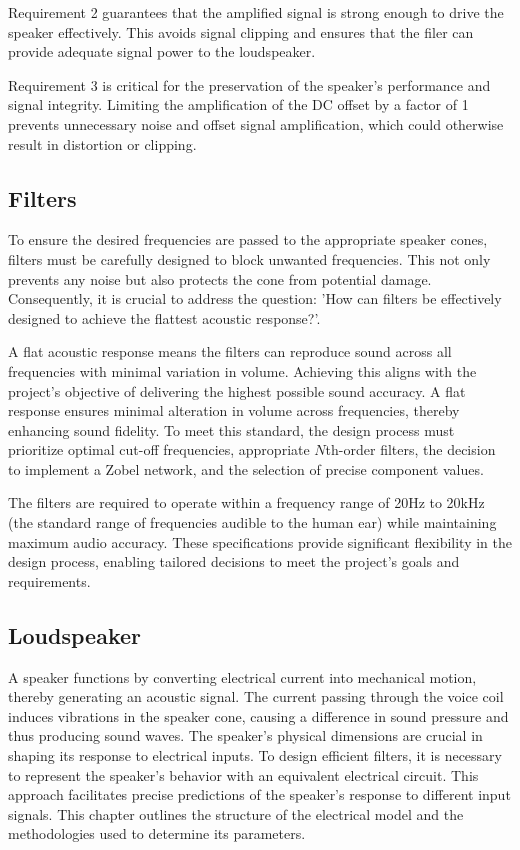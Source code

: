 Requirement 2 guarantees that the amplified signal is strong enough to drive the speaker effectively. This avoids signal clipping and ensures that the filer can provide adequate signal power to the loudspeaker.

Requirement 3 is critical for the preservation of the speaker's performance and signal integrity. Limiting the amplification of the DC offset by a factor of 1 prevents unnecessary noise and offset signal amplification, which could otherwise result in distortion or clipping.

\subsection{Filters}
To ensure the desired frequencies are passed to the appropriate speaker cones, filters must be carefully designed to block unwanted frequencies. This not only prevents any noise but also protects the cone from potential damage. Consequently, it is crucial to address the question: 'How can filters be effectively designed to achieve the flattest acoustic response?'.

A flat acoustic response means the filters can reproduce sound across all frequencies with minimal variation in volume. Achieving this aligns with the project's objective of delivering the highest possible sound accuracy. A flat response ensures minimal alteration in volume across frequencies, thereby enhancing sound fidelity. To meet this standard, the design process must prioritize optimal cut-off frequencies, appropriate $N$th-order filters, the decision to implement a Zobel network, and the selection of precise component values.

The filters are required to operate within a frequency range of 20Hz to 20kHz (the standard range of frequencies audible to the human ear) while maintaining maximum audio accuracy. These specifications provide significant flexibility in the design process, enabling tailored decisions to meet the project's goals and requirements.

\subsection{Loudspeaker}
A speaker functions by converting electrical current into mechanical motion, thereby generating an acoustic signal. The current passing through the voice coil induces vibrations in the speaker cone, causing a difference in sound pressure and thus producing sound waves. The speaker's physical dimensions are crucial in shaping its response to electrical inputs. To design efficient filters, it is necessary to represent the speaker's behavior with an equivalent electrical circuit. This approach facilitates precise predictions of the speaker's response to different input signals. This chapter outlines the structure of the electrical model and the methodologies used to determine its parameters.

